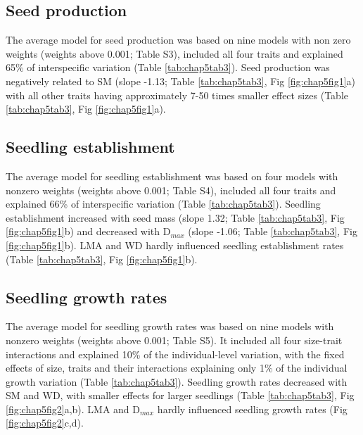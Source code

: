\documentclass[b5paper,justified]{tufte-book} %
\begin{document}
\begin{fullwidth}
\subsection{Seed production}
The average model for seed production was based on nine models with non zero weights (weights above 0.001;
Table S3), included all four traits and explained 65\% of interspecific variation (Table \ref{tab:chap5tab3}). Seed production was negatively related to SM (slope -1.13; Table \ref{tab:chap5tab3}, Fig \ref{fig:chap5fig1}a) with
all other traits having approximately 7-50 times smaller effect sizes (Table \ref{tab:chap5tab3}, Fig \ref{fig:chap5fig1}a).

\subsection{Seedling establishment}
The average model for seedling establishment was based on four models with nonzero weights (weights above
0.001; Table S4), included all four traits and explained 66\% of interspecific variation (Table \ref{tab:chap5tab3}). Seedling establishment increased with seed mass (slope 1.32; Table \ref{tab:chap5tab3}, Fig \ref{fig:chap5fig1}b) and decreased with D$_{max}$ (slope -1.06; Table \ref{tab:chap5tab3}, Fig \ref{fig:chap5fig1}b). LMA and WD hardly influenced seedling establishment rates (Table \ref{tab:chap5tab3}, Fig \ref{fig:chap5fig1}b).
\subsection{Seedling growth rates}
The average model for seedling growth rates was based on nine models with nonzero weights (weights above 0.001;
Table S5). It included all four size-trait interactions and explained 10\% of the individual-level variation, with the fixed effects of size, traits and their interactions explaining only 1\% of the individual growth variation (Table \ref{tab:chap5tab3}). Seedling growth rates decreased with SM and WD, with smaller effects for larger seedlings (Table \ref{tab:chap5tab3}, Fig \ref{fig:chap5fig2}a,b). LMA and D$_{max}$ hardly influenced seedling growth rates (Fig \ref{fig:chap5fig2}c,d).




\end{fullwidth}
\end{document}
